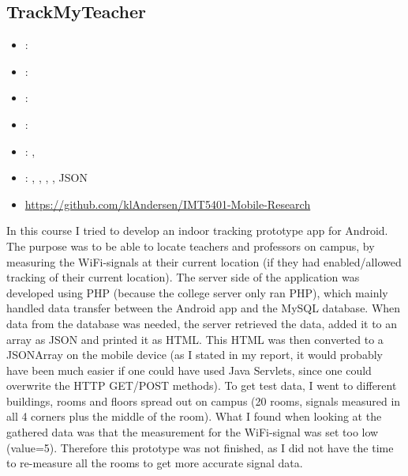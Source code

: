 \subsection{TrackMyTeacher}
\label{sec:trackmyteacher}
\begin{itemize} 
	\item {}: 
	\item {}: 
	\item {}: 
	\item {}: 
	\item {}: , 
	\item {}: , , , , JSON
	\item {} \url{https://github.com/klAndersen/IMT5401-Mobile-Research}
\end{itemize} 
In this course I tried to develop an indoor tracking prototype app for Android. 
The purpose was to be able to locate teachers and professors on campus, by measuring the WiFi-signals at their current location 
(if they had enabled/allowed tracking of their current location).
\vspace{0.5em}\newline
The server side of the application was developed using PHP (because the college server only ran PHP), which mainly handled data transfer between the Android app and the MySQL database.
When data from the database was needed, the server retrieved the data, added it to an array as JSON and printed it as HTML. 
This HTML was then converted to a JSONArray on the mobile device (as I stated in my report, it would probably have been much easier if one could have used Java Servlets, 
since one could overwrite the HTTP GET/POST methods).
\vspace{0.5em}\newline
To get test data, I went to different buildings, rooms and floors spread out on campus (20 rooms, signals measured in all 4 corners plus the middle of the room). 
What I found when looking at the gathered data was that the measurement for the WiFi-signal was set too low (value=5). 
Therefore this prototype was not finished, as I did not have the time to re-measure all the rooms to get more accurate signal data.


